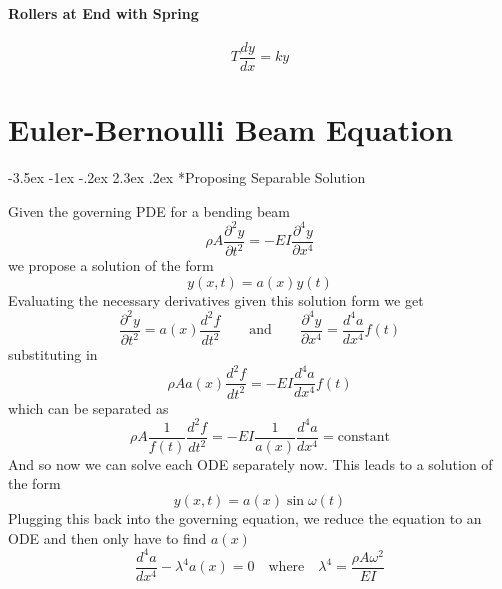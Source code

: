 \documentclass[letterpaper,twocolumn,notitlepage]{article}
\makeatletter
\renewcommand\subsection{\@startsection{section}{1}{\z@}%
 {-3.5ex \@plus-1ex \@minus-.2ex}%
 {2.3ex \@plus.2ex}%
 {\fontsize{8pt}{8pt}\selectfont\sffamily}}
\makeatother
\begin{document}
  \paragraph{Rollers at End with Spring}
  \begin{equation*}
    \boxed{T\frac{dy}{dx}=ky}
  \end{equation*}

  \clearpage

  \section*{Euler-Bernoulli Beam Equation}

  \subsection*{Proposing Separable Solution}

  Given the governing PDE for a bending beam
  \begin{equation*}
    \boxed{\rho A\frac{\partial^{2}y}{\partial t^{2}}=-EI\frac{\partial^{4}y}{\partial x^{4}}}
  \end{equation*}
  we propose a solution of the form
  \begin{equation*}
    \boxed{y(x,t)=a(x)y(t)}
  \end{equation*}
  Evaluating the necessary derivatives given this solution form we get
  \begin{equation*}
    \frac{\partial^{2}y}{\partial t^{2}}=a(x)\frac{d^{2}f}{dt^{2}}
    \qquad
    \text{and}
    \qquad
    \frac{\partial^{4}y}{\partial x^{4}}=\frac{d^{4}a}{dx^{4}}f(t)
  \end{equation*}
  substituting in
  \begin{equation*}
    \rho Aa(x)\frac{d^{2}f}{dt^{2}}=-EI\frac{d^{4}a}{dx^{4}}f(t)
  \end{equation*}
  which can be separated as
  \begin{equation*}
    \rho A\frac{1}{f(t)}\frac{d^{2}f}{dt^{2}}=-EI\frac{1}{a(x)}\frac{d^{4}a}{dx^{4}}=\text{constant}
  \end{equation*}
  And so now we can solve each ODE separately now.
  This leads to a solution of the form
  \begin{equation*}
    \boxed{y(x,t)=a(x)\sin\omega(t)}
  \end{equation*}
  Plugging this back into the governing equation, we reduce the equation to an ODE and then only have to find $a(x)$
  \begin{equation*}
    \boxed{\frac{d^{4}a}{dx^{4}}-\lambda^{4}a(x)=0}
    \quad
    \text{where}
    \quad
    \boxed{\lambda^{4}=\frac{\rho A\omega^{2}}{EI}}
  \end{equation*}
\end{document}
